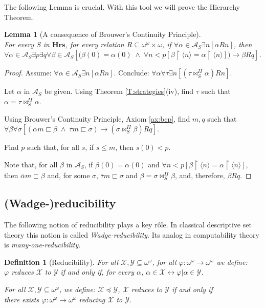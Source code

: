 \documentclass[a4paper]{amsart}
\theoremstyle{plain}
\newtheorem{lemma}[theorem]{Lemma}
\newtheorem{definition}{Definition}
\begin{document}
  The following Lemma is crucial. With this tool we will prove the Hierarchy Theorem.
  \begin{lemma}[A consequence of Brouwer's Continuity Principle]\label{L:continuityborel}$\;$\\For every $S$ in $\mathbf{Hrs}$, for every relation $R\subseteq \omega^\omega\times\omega$, if $\forall \alpha \in \mathcal{A}_S\exists n[\alpha R n]$, then $\forall \alpha \in \mathcal{A}_S\exists p\exists q\forall \beta \in \mathcal{A}_S[\bigl(\beta(0)=\alpha(0) \;\wedge\;\forall n<p[\beta\upharpoonright\langle n\rangle=\alpha\upharpoonright \langle n\rangle]\bigr)\rightarrow \beta Rq]$. \end{lemma}
  
  \begin{proof}Assume: $\forall \alpha\in \mathcal{A}_S\exists n[\alpha Rn]$. 
  Conclude: $\forall \alpha \forall \tau\exists n[(\tau\Join^{II}_S\alpha)Rn]$.
  
 Let $\alpha$ in $\mathcal{A}_S$ be given. Using Theorem \ref{T:strategies}(iv), find $\tau$ such that $\alpha = \tau\Join_S^{II}\alpha$.
 
  Using Brouwer's Continuity Principle, Axiom \ref{ax:bcp}, find $m,q$ such that \\$\forall \beta\forall \sigma[(\overline\alpha m\sqsubset \beta \;\wedge\; \overline \tau m\sqsubset \sigma)\rightarrow (\sigma\Join^{II}_S \beta)Rq]$.
  
  Find $p$ such that, for all $s$, if $s\le m$, then $s(0)< p$.
  
  Note that, for all $\beta$ in $\mathcal{A}_S$, if $\beta(0)=\alpha(0)$ and $\forall n<p[\beta\upharpoonright\langle n \rangle =\alpha\upharpoonright\langle n \rangle]$, then $\overline \alpha m \sqsubset \beta$ and, for some $\sigma$, $\overline \tau m\sqsubset \sigma$ and $\beta=\sigma\Join^{II}_S\beta$, and, therefore, $\beta Rq$. \end{proof}
  
\subsection{(Wadge-)reducibility}  
 The following notion of reducibility plays a key r\^ole. In classical descriptive set theory this notion is called {\it Wadge-reducibility}.  Its analog in computability theory is  {\it many-one-reducibility}.  
 \begin{definition}[Reducibility] For all $\mathcal{X}, \mathcal{Y}\subseteq \omega^\omega$, for all $\varphi:\omega^\omega\rightarrow \omega^\omega$ we define: \\\emph{$\varphi$ reduces $\mathcal{X}$ to $\mathcal{Y}$} if and only if, for every $\alpha$, $\alpha \in \mathcal{X} \leftrightarrow \varphi|\alpha \in \mathcal{Y}$. 
 
 \smallskip For all $\mathcal{X}, \mathcal{Y}\subseteq \omega^\omega$, we define: $\mathcal{X}\preceq \mathcal{Y}$, $\mathcal{X}$ \emph{reduces to} $\mathcal{Y}$ if and only if \\there exists $\varphi:\omega^\omega\rightarrow\omega^\omega$ reducing $\mathcal{X}$ to $\mathcal{Y}$. \end{definition}
 
\end{document}
